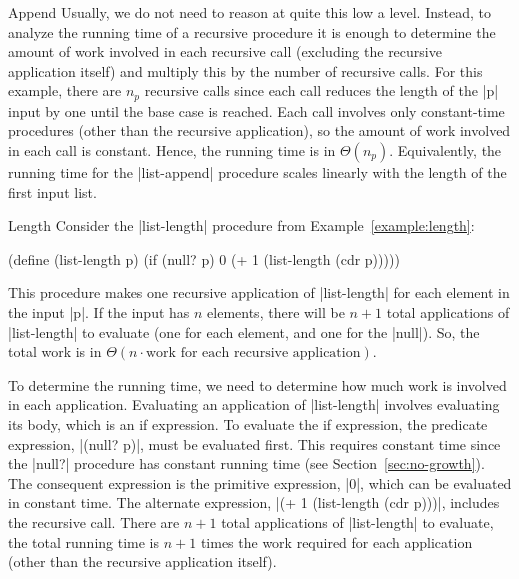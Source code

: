 \begin{schemeregion}
\begin{examplenobar}{Append}
Usually, we do not need to reason at quite this low a level.  Instead, to analyze the running time of a recursive procedure it is enough to determine the amount of work involved in each recursive call (excluding the recursive application itself) and multiply this by the number of recursive calls.  For this example, there are $n_p$ recursive calls since each call reduces the length of the \scheme|p| input by one until the base case is reached.  Each call involves only constant-time procedures (other than the recursive application), so the amount of work involved in each call is constant.  Hence, the running time is in $\Theta(n_p)$.  Equivalently, the running time for the \scheme|list-append| procedure scales linearly with the length of the first input list. 

\end{examplenobar}

\begin{examplenobar}{Length}\label{example:time-list-length} Consider the \scheme|list-length| procedure from Example~\ref{example:length}:

\begin{schemedisplay}
(define (list-length p) (if (null? p) 0 (+ 1 (list-length (cdr p)))))
\end{schemedisplay}

This procedure makes one recursive application of \scheme|list-length| for each element in the input \scheme|p|.  If the input has $n$ elements, there will be $n+1$ total applications of \scheme|list-length| to evaluate (one for each element, and one for the \scheme|null|).  So, the total work is in $\Theta(n \cdot \textrm{work for each recursive application})$.

To determine the running time, we need to determine how much work is involved in each application.  Evaluating an application of \scheme|list-length| involves evaluating its body, which is an if expression.  To evaluate the if expression, the predicate expression, \scheme|(null? p)|, must be evaluated first.  This requires constant time since the \scheme|null?| procedure has constant running time (see Section~\ref{sec:no-growth}).   The consequent expression is the primitive expression, \scheme|0|, which can be evaluated in constant time.    The alternate expression, \scheme|(+ 1 (list-length (cdr p)))|, includes the recursive call.  There are $n+1$ total applications of \scheme|list-length| to evaluate, the total running time is $n+1$ times the work required for each application (other than the recursive application itself).


\end{examplenobar}
\end{schemeregion}
